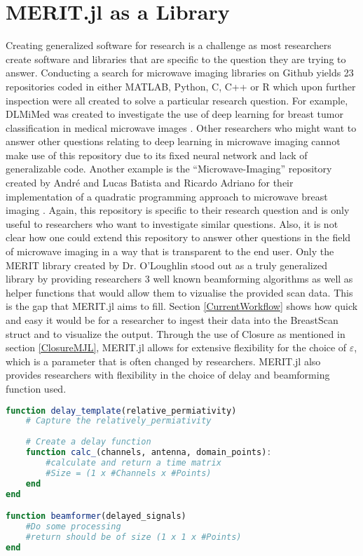 \section{MERIT.jl as a Library}
\label{MERITAsLibrary}
Creating generalized software for research is a challenge as most researchers create software and libraries that are
specific to the question they are trying to answer. Conducting a search for microwave imaging libraries on Github yields
23 repositories coded in either MATLAB, Python, C, C++ or R which upon further inspection were all created to solve a
particular research question. For example, DLMiMed was created to investigate the use of deep learning for breast tumor
classification in medical microwave images \cite{gerazovDLMiMed17}. Other researchers who might want to answer other
questions relating to deep learning in microwave imaging cannot make use of this repository due to its fixed neural
network and lack of generalizable code. Another example is the ``Microwave-Imaging'' repository created by André and
Lucas Batista and Ricardo Adriano for their implementation of a quadratic programming approach to microwave breast
imaging \cite{batistaMicrowaveImaging21}. Again, this repository is specific to their research question and is only
useful to researchers who want to investigate similar questions. Also, it is not clear how one could extend this
repository to answer other questions in the field of microwave imaging in a way that is transparent to the end user.
Only the MERIT library created by Dr. O'Loughlin stood out as a truly generalized library by providing researchers 3
well known beamforming algorithms as well as helper functions that would allow them to vizualise the provided scan data.
This is the gap that MERIT.jl aims to fill. Section \ref{CurrentWorkflow} shows how quick and easy it would be for a
researcher to ingest their data into the BreastScan struct and to visualize the output. Through the use of Closure as
mentioned in section \ref{ClosureMJL}, MERIT.jl allows for extensive flexibility for the choice of $\varepsilon$, which
is a parameter that is often changed by researchers. MERIT.jl also provides researchers with flexibility in the choice
of delay and beamforming function used. 
\begin{lstlisting}[language=Julia]
function delay_template(relative_permiativity)
    # Capture the relatively_permiativity
    
    # Create a delay function
    function calc_(channels, antenna, domain_points):
        #calculate and return a time matrix
        #Size = (1 x #Channels x #Points)
    end
end

function beamformer(delayed_signals)
    #Do some processing
    #return should be of size (1 x 1 x #Points)
end
\end{lstlisting}

